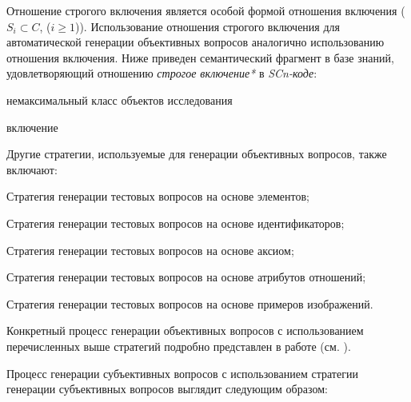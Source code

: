 \begin{textitemize}
\begin{textitemize}
		Отношение строгого включения является особой формой отношения включения ($S_{i}\subset  C $, ($i\ge 1$)). Использование отношения строгого включения для автоматической генерации объективных вопросов аналогично использованию отношения включения. Ниже приведен семантический фрагмент в базе знаний, удовлетворяющий отношению \textit{строгое включение*} в \textit{SCn-коде}:
		
		\begin{SCn}
			
			\begin{scnhaselementrolelist}{немаксимальный класс объектов исследования}
				\begin{scnrelfromlist}{включение} 
				\end{scnrelfromlist}
			\end{scnhaselementrolelist}
		\end{SCn}
	\end{textitemize}
	
\end{textitemize}	

Другие стратегии, используемые для генерации объективных вопросов, также включают:
\begin{textitemize}
	\item Стратегия генерации тестовых вопросов на основе элементов;
	\item Стратегия генерации тестовых вопросов на основе идентификаторов;
	\item Стратегия генерации тестовых вопросов на основе аксиом; 
	\item Стратегия генерации тестовых вопросов на основе атрибутов отношений;
	\item Стратегия генерации тестовых вопросов на основе примеров изображений.
\end{textitemize}

Конкретный процесс генерации объективных вопросов с использованием перечисленных выше стратегий подробно представлен в работе (см. ).

Процесс генерации субъективных вопросов с использованием стратегии генерации субъективных вопросов выглядит следующим образом:

